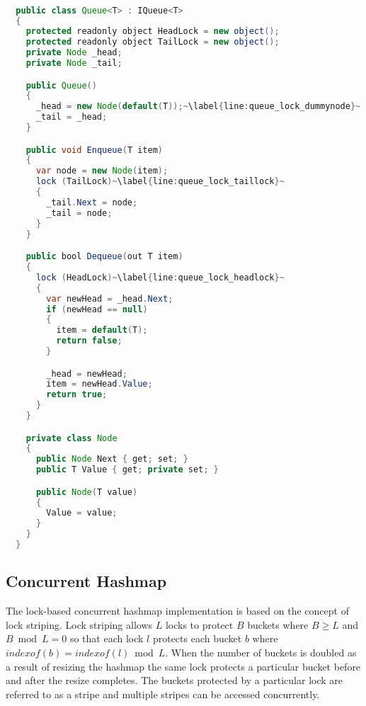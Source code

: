 \begin{lstlisting}[label=lst:impl_queue_lock,
  caption={Lock Based Concurrent Queue Implementation},
  language=Java,  
  showspaces=false,
  showtabs=false,
  breaklines=true,
  showstringspaces=false,
  breakatwhitespace=true,
  commentstyle=\color{greencomments},
  keywordstyle=\color{bluekeywords},
  stringstyle=\color{redstrings},
  escapechar=~,
  morekeywords={atomic, retry, orelse, var, get, set, ref, out, readonly, virtual, override, lock}]  % Start your code-block

  public class Queue<T> : IQueue<T>
  {
    protected readonly object HeadLock = new object();
    protected readonly object TailLock = new object();
    private Node _head;
    private Node _tail;

    public Queue()
    {
      _head = new Node(default(T));~\label{line:queue_lock_dummynode}~
      _tail = _head;
    }

    public void Enqueue(T item)
    {
      var node = new Node(item);
      lock (TailLock)~\label{line:queue_lock_taillock}~
      {
        _tail.Next = node;
        _tail = node;
      }
    }

    public bool Dequeue(out T item)
    {
      lock (HeadLock)~\label{line:queue_lock_headlock}~
      {
        var newHead = _head.Next;
        if (newHead == null)
        {
          item = default(T);
          return false;
        }

        _head = newHead;
        item = newHead.Value;
        return true;
      }
    }

    private class Node
    {
      public Node Next { get; set; }
      public T Value { get; private set; }

      public Node(T value)
      {
        Value = value;
      }
    }
  }

\end{lstlisting}

\subsection{Concurrent Hashmap}
The lock-based concurrent hashmap implementation is based on the concept of lock striping. Lock striping allows $L$ locks to protect $B$ buckets where $B \geq L$ and $B \bmod L = 0$ so that each lock $l$ protects each bucket $b$ where $indexof(b) = indexof(l) \bmod L$\cite[p. 304]{herlihy2012art}. When the number of buckets is doubled as a result of resizing the hashmap the same lock protects a particular bucket before and after the resize completes. The buckets protected by a particular lock are referred to as a stripe and multiple stripes can be accessed concurrently.


